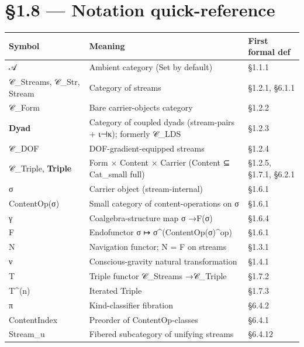 \documentclass[11pt, openany]{book}
\newcommand{\sectionbreak}{\clearpage}
\begin{document}
\sectionbreak

\section{§1.8 --- Notation quick-reference}

\begingroup\setlength{\tabcolsep}{3pt}\renewcommand{\arraystretch}{1.15}\footnotesize
\begin{longtable}{p{0.96in} p{2.49in} p{0.88in}}
\toprule
Symbol & Meaning & First formal def \\
\midrule
\endhead
\bottomrule
\endfoot
𝒜 & Ambient category (Set by default) & §1.1.1 \\
\midrule
𝒞\_\allowbreak{}Streams, 𝒞\_\allowbreak{}Str, Stream & Category of streams & §1.2.1, §6.1.1 \\
\midrule
𝒞\_\allowbreak{}Form & Bare carrier-objects category & §1.2.2 \\
\midrule
\textbf{Dyad} & Category of coupled dyads (stream-pairs + ι⊣κ); formerly 𝒞\_\allowbreak{}LDS & §1.2.3 \\
\midrule
𝒞\_\allowbreak{}DOF & DOF-gradient-equipped streams & §1.2.4 \\
\midrule
𝒞\_\allowbreak{}Triple, \textbf{Triple} & Form × Content × Carrier (Content ⊆ Cat\_\allowbreak{}small full) & §1.2.5, §1.7.1, §6.2.1 \\
\midrule
σ & Carrier object (stream-internal) & §1.6.1 \\
\midrule
ContentOp(σ) & Small category of content-operations on σ & §1.6.1 \\
\midrule
γ & Coalgebra-structure map σ →\allowbreak  F(σ) & §1.6.4 \\
\midrule
F & Endofunctor σ ↦ σ\textasciicircum{}(ContentOp(σ)\textasciicircum{}op) & §1.6.1 \\
\midrule
N & Navigation functor; N = F on streams & §1.3.1 \\
\midrule
ν & Conscious-gravity natural transformation & §1.4.1 \\
\midrule
T & Triple functor 𝒞\_\allowbreak{}Streams →\allowbreak  𝒞\_\allowbreak{}Triple & §1.7.2 \\
\midrule
T\textasciicircum{}(n) & Iterated Triple & §1.7.3 \\
\midrule
π & Kind-classifier fibration & §6.4.2 \\
\midrule
ContentIndex & Preorder of ContentOp-classes & §6.4.1 \\
\midrule
Stream\_\allowbreak{}u & Fibered subcategory of unifying streams & §6.4.12 \\

\end{longtable}
\end{document}
